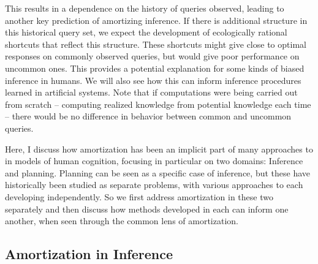 This results in a dependence on the history of queries observed, leading to another key prediction of amortizing inference. If there is additional structure in this historical query set, we expect the development of ecologically rational shortcuts that reflect this structure. These shortcuts might give close to optimal responses on commonly observed queries, but would give poor performance on uncommon ones. This provides a potential explanation for some kinds of biased inference in humans. We will also see how this can inform inference procedures learned in artificial systems. Note that if computations were being carried out from scratch -- computing realized knowledge from potential knowledge each time -- there would be no difference in behavior between common and uncommon queries.

Here, I discuss how amortization has been an implicit part of many approaches to  in models of human cognition, focusing in particular on two domains: Inference and planning. Planning can be seen as a specific case of inference\citep{botvinick2012planning}, but these have historically been studied as separate problems, with various approaches to each developing independently. So we first address amortization in these two separately and then discuss how  methods developed in each can inform one another, when seen through the common lens of amortization.

\subsection{Amortization in Inference}


